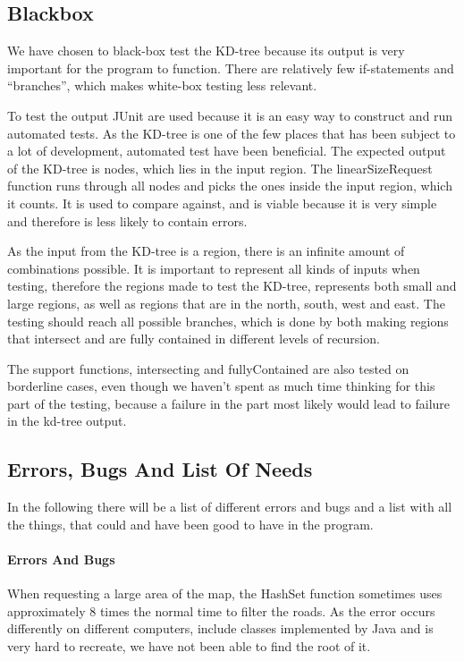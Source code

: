\documentclass[a4paper,10pt,titlepage]{article}
\begin{document}
		\subsection{Blackbox}
		We have chosen to black-box test the KD-tree because its output is very important for the program to function. There are relatively few if-statements and “branches”, which makes white-box testing less relevant.

To test the output JUnit are used because it is an easy way to construct and run automated tests. As the KD-tree is one of the few places that has been subject to a lot of development, automated test have been beneficial. The expected output of the KD-tree is nodes, which lies in the input region. The linearSizeRequest function runs through all nodes and picks the ones inside the input region, which it counts. It is used to compare against, and is viable because it is very simple and therefore is less likely to contain errors.

As the input from the KD-tree is a region, there is an infinite amount of combinations possible. It is important to represent all kinds of inputs when testing, therefore the regions made to test the KD-tree, represents both small and large regions, as well as regions that are in the north, south, west and east. The testing should reach all possible branches, which is done by both making regions that intersect and are fully contained in different levels of recursion.

The support functions, intersecting and fullyContained are also tested on borderline cases, even though we haven't spent as much time thinking for this part of the testing, because a failure in the part most likely would lead to failure in the kd-tree output.
			
		\newpage
		\subsection{Errors, Bugs And List Of Needs}

		In the following there will be a list of different errors and bugs and a list with all the things, that could and have been good to have in the program.
		\paragraph{Errors And Bugs}\mbox{}
		
When requesting a large area of the map, the HashSet function sometimes uses approximately 8 times the normal time to filter the roads. As the error occurs differently on different computers, include classes implemented by Java and is very hard to recreate, we have not been able to find the root of it.
\end{document}
